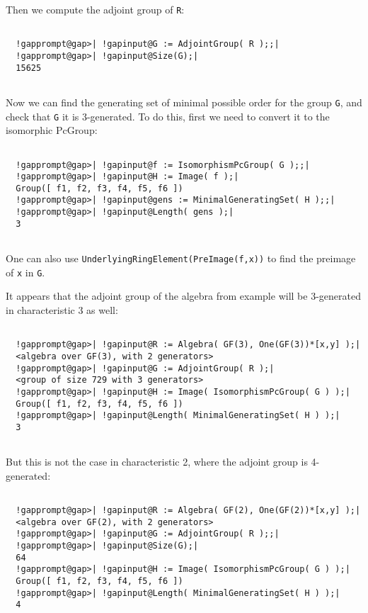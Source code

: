 \documentclass[a4paper,11pt]{report}
\begin{document}
{\begin{Verbatim}[commandchars=!@|,fontsize=\small,frame=single,label=Example]
\end{Verbatim}
 Then we compute the adjoint group of \texttt{R}: 
\begin{Verbatim}[commandchars=!@|,fontsize=\small,frame=single,label=Example]
  
  !gapprompt@gap>| !gapinput@G := AdjointGroup( R );;|
  !gapprompt@gap>| !gapinput@Size(G);|
  15625
  
\end{Verbatim}
 Now we can find the generating set of minimal possible order for the group \texttt{G}, and check that \texttt{G} it is 3-generated. To do this, first we need to convert it to the isomorphic
PcGroup: 
\begin{Verbatim}[commandchars=!@|,fontsize=\small,frame=single,label=Example]
  
  !gapprompt@gap>| !gapinput@f := IsomorphismPcGroup( G );;|
  !gapprompt@gap>| !gapinput@H := Image( f );|
  Group([ f1, f2, f3, f4, f5, f6 ])
  !gapprompt@gap>| !gapinput@gens := MinimalGeneratingSet( H );;|
  !gapprompt@gap>| !gapinput@Length( gens );|
  3
  
\end{Verbatim}
 One can also use \texttt{UnderlyingRingElement(PreImage(f,x))} to find the preimage of \texttt{x} in \texttt{G}. 

 It appears that the adjoint group of the algebra from example will be
3-generated in characteristic 3 as well: 
\begin{Verbatim}[commandchars=!@|,fontsize=\small,frame=single,label=Example]
  
  !gapprompt@gap>| !gapinput@R := Algebra( GF(3), One(GF(3))*[x,y] );|
  <algebra over GF(3), with 2 generators>
  !gapprompt@gap>| !gapinput@G := AdjointGroup( R );|
  <group of size 729 with 3 generators>
  !gapprompt@gap>| !gapinput@H := Image( IsomorphismPcGroup( G ) );|
  Group([ f1, f2, f3, f4, f5, f6 ])
  !gapprompt@gap>| !gapinput@Length( MinimalGeneratingSet( H ) );|
  3
  
\end{Verbatim}
 But this is not the case in characteristic 2, where the adjoint group is
4-generated: 
\begin{Verbatim}[commandchars=!@|,fontsize=\small,frame=single,label=Example]
  
  !gapprompt@gap>| !gapinput@R := Algebra( GF(2), One(GF(2))*[x,y] );|
  <algebra over GF(2), with 2 generators>
  !gapprompt@gap>| !gapinput@G := AdjointGroup( R );;|
  !gapprompt@gap>| !gapinput@Size(G);|
  64
  !gapprompt@gap>| !gapinput@H := Image( IsomorphismPcGroup( G ) );|
  Group([ f1, f2, f3, f4, f5, f6 ])
  !gapprompt@gap>| !gapinput@Length( MinimalGeneratingSet( H ) );|
  4
  
\end{Verbatim}
 }
\end{document}
